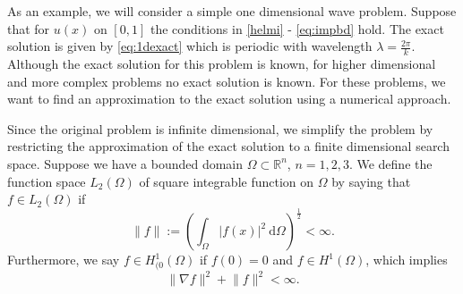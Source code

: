 \documentclass[a4paper]{article}
\newcommand{\dd}{\mathrm{d}}
\newcommand{\Reals}{\mathbb{R}}
\newcommand{\LO}{\ensuremath{L_2(\Omega)}}
\newcommand{\HO}{\ensuremath{H^1(\Omega)}}
\newcommand{\HOzero}{\ensuremath{H^1_{(0}(\Omega)}}
\begin{document}
As an example, we will consider a simple one dimensional wave problem.
Suppose that for $u(x)$ on $[0, 1]$ the conditions in \eqref{helmi} -
\eqref{eq:impbd} hold. 
The exact solution is given by \eqref{eq:1dexact}
which is periodic with wavelength $\lambda = \frac{2\pi}{k}$.
%
%
Although the exact solution for this problem is known, for higher
dimensional and more complex problems no exact solution is known. For
these problems, we want to find an approximation to the exact solution
using a numerical approach.

Since the original problem is infinite dimensional, we simplify the
problem by restricting the approximation of the exact solution to a
finite dimensional search space. Suppose we have a bounded domain
$\Omega \subset \Reals^n$, $n = 1, 2, 3$.  We define the function
space $\LO$ of square integrable function on $\Omega$ by saying that
$f \in \LO$ if
\begin{equation}
  \lVert f \rVert := \left(
    \int_\Omega | f(x) |^2 \ \dd\Omega \right)^{\frac{1}{2}} < \infty.
\end{equation}
Furthermore, we say $f \in \HOzero$ if $f(0) = 0$ and $f \in \HO$,
which implies
\begin{equation}
  \lVert \nabla f \rVert^2 + \lVert f \rVert^2 < \infty.
\end{equation}
\end{document}
